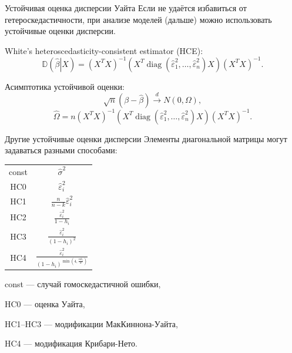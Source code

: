 \documentclass[9pt,pdf,utf8,hyperref={unicode},aspectratio=169]{beamer}
\DeclareMathOperator{\diag}{diag}
\begin{document}
\begin{frame}{Устойчивая оценка дисперсии Уайта}
    Если не удаётся избавиться от гетероскедастичности, при анализе моделей (дальше) можно использовать устойчивые оценки дисперсии.

    White's heteroscedasticity-consistent estimator (HCE):
    $$\mathbb{D}\left(\left.\hat{\beta}\right|X\right) = \left(X^TX\right)^{-1} \left(X^T \diag \left(\hat{\varepsilon}^2_1, \dots, \hat{\varepsilon}^2_n\right) X\right) \left(X^TX\right)^{-1}.$$
    
    \bigskip

    Асимптотика устойчивой оценки:
    $$\sqrt{n} \left(\beta - \hat{\beta}\right) \xrightarrow{d} N\left(0, \Omega\right),$$
    $$\hat{\Omega} = n \left(X^TX\right)^{-1} \left(X^T \diag \left(\hat{\varepsilon}^2_1, \dots, \hat{\varepsilon}^2_n\right) X\right) \left(X^TX\right)^{-1}.$$    
\end{frame}

\begin{frame}{Другие устойчивые оценки дисперсии}
    Элементы диагональной матрицы могут задаваться разными способами:

    \bigskip

    \begin{center}
    \begin{tabular}{c c}
      const & $\hat{\sigma}^2$ \\
      HC0   & $\hat{\varepsilon}^2_i$  \\
      HC1   & $\frac{n}{n-k}\hat{\varepsilon}^2_i$  \\
      HC2   & $\frac{\hat{\varepsilon}^2_i}{1-h_i}$  \\
      HC3   & $\frac{\hat{\varepsilon}^2_i}{\left(1-h_i\right)^2}$  \\
      HC4   & $\frac{\hat{\varepsilon}^2_i}{\left(1-h_i\right)^{\min\left(4, \frac{nh_i}{k}\right)}}$  \\
    \end{tabular}
    \end{center}

    \bigskip

    const --- случай гомоскедастичной ошибки,

    HC0 --- оценка Уайта,

    HC1--HC3 --- модификации МакКиннона-Уайта,

    HC4 --- модификация Крибари-Нето.
\end{frame}
\end{document}
